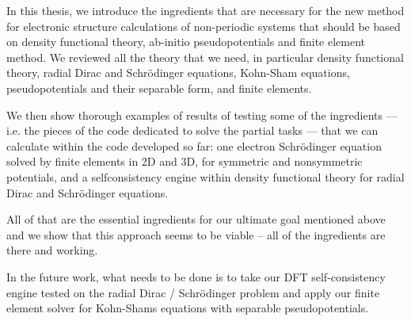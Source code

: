 In this thesis, we introduce the ingredients that are necessary for the new
method for electronic structure calculations of non-periodic systems that
should be based on density functional theory, ab-initio pseudopotentials and
finite element method. We reviewed all the theory that we need, in particular
density functional theory, radial Dirac and Schr\"odinger equations, Kohn-Sham
equations, pseudopotentials and their separable form, and finite elements.

We then show thorough examples of results of testing some of the ingredients
--- i.e. the pieces of the code dedicated to solve the partial tasks --- that
we can calculate within the code developed so far: one electron Schr\"odinger
equation solved by finite elements in 2D and 3D, for symmetric and nonsymmetric
potentials, and a selfconsistency engine within density functional theory for
radial Dirac and Schr\"odinger equations.

All of that are the essential ingredients for our ultimate goal mentioned above
and we show that this approach seems to be viable -- all of the ingredients are
there and working.

In the future work, what needs to be done is to take our DFT self-consistency
engine tested on the radial Dirac / Schr\"odinger problem and apply our finite
element solver for Kohn-Shams equations with separable pseudopotentials.
